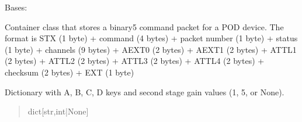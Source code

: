 \documentclass[letterpaper,10pt,english]{sphinxmanual}
\begin{document}
\begin{fulllineitems}
\label{\detokenize{Morelia.Packets:Morelia.Packets.Binary5.PacketBinary5}}
\pysigstartsignatures
{}
\pysigstopsignatures
\sphinxAtStartPar
Bases: {\hyperref[\detokenize{Morelia.Packets:Morelia.Packets.Packet.Packet}]{}}

\sphinxAtStartPar
Container class that stores a binary5 command packet for a POD device. The format is     STX (1 byte) + command (4 bytes) + packet number (1 byte) + status (1 byte)     + channels (9 bytes) + AEXT0 (2 bytes) + AEXT1 (2 bytes) + ATTL1 (2 bytes)     + ATTL2 (2 bytes) + ATTL3 (2 bytes) + ATTL4 (2 bytes) + checksum (2 bytes)     + EXT (1 byte)

\begin{fulllineitems}
\label{\detokenize{Morelia.Packets:Morelia.Packets.Binary5.PacketBinary5._ssGain}}
\pysigstartsignatures
{}
\pysigstopsignatures
\sphinxAtStartPar
Dictionary with A, B, C, D keys and             second stage gain values (1, 5, or None).
\begin{quote}\begin{description}
\sphinxAtStartPar
dict{[}str,int|None{]}


\end{description}
\end{quote}
\end{fulllineitems}
\end{fulllineitems}
\end{document}
